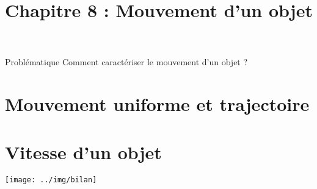 \documentclass[xcolor={dvipsnames}]{beamer}
\title{Chapitre 8 : Mouvement d'un objet}
\begin{document}
\begin{frame}
  \titlepage 
\end{frame}


\begin{frame}
\begin{block}{Problématique}
	{\Large Comment caractériser le mouvement d'un objet ?}
\end{block}
\end{frame}


\section{Mouvement uniforme et trajectoire}




\begin{frame}
	
\end{frame}



\section{Vitesse d'un objet}

\begin{frame}
	
\end{frame}

\begin{frame}
	\begin{center}
		\texttt{[image: ../img/bilan]}
	\end{center}
\end{frame}


%	
%
%
%	
\end{document}
